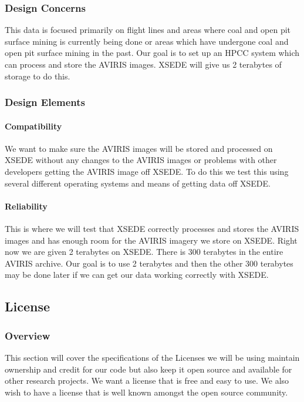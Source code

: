 \documentclass[10pt,draftclsnofoot,onecolumn,journal,compsoc]{IEEEtran}
\begin{document}
\subsubsection{Design Concerns}

\noindent This data is focused primarily on flight lines and areas where coal and open pit surface mining is currently being done or areas which have undergone coal and open pit surface mining in the past. Our goal is to set up an HPCC system which can process and store the AVIRIS images. XSEDE will give us 2 terabytes of storage to do this.

\subsubsection{Design Elements}
\paragraph{Compatibility}

\noindent We want to make sure the AVIRIS images will be stored and processed on XSEDE without any changes to the AVIRIS images or problems with other developers getting the AVIRIS image off XSEDE. To do this we test this using several different operating systems and means of getting data off XSEDE.

\paragraph{Reliability}

\noindent This is where we will test that XSEDE correctly processes and stores the AVIRIS images and has enough room for the AVIRIS imagery we store on XSEDE. Right now we are given 2 terabytes on XSEDE. There is 300 terabytes in the entire AVIRIS archive. Our goal is to use 2 terabytes and then the other 300 terabytes may be done later if we can get our data working correctly with XSEDE.

\subsection{License}
\subsubsection{Overview}
\noindent This section will cover the specifications of the Licenses we will be using maintain ownership and credit for our code but also keep it open source and available for other research projects. We want a license that is free and easy to use. We also wish to have a license that is well known amongst the open source community.
\end{document}
